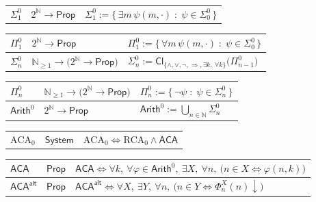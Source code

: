 \documentclass[11pt,reqno]{amsart}
\theoremstyle{blueplain}
\numberwithin{equation}{section}
\begin{document}
{\begin{tabular}{|m{4cm}|m{5cm}|m{9cm}|}
		$\Sigma^0_1$ & $2^{\mathbb{N}}\to\mathsf{Prop}$ & $\Sigma^0_1 := \bigl\{\,\exists m\,\psi(m,\cdot) \;:\; \psi\in\Sigma^0_0\,\bigr\}$ \\
	\end{tabular}%
	\noindent \newline
	\noindent
	\begin{tabular}{|m{4cm}|m{5cm}|m{9cm}|}
		\hline
		$\Pi^0_1$ & $2^{\mathbb{N}}\to\mathsf{Prop}$ & $\Pi^0_1 := \bigl\{\,\forall m\,\psi(m,\cdot) \;:\; \psi\in\Sigma^0_0\,\bigr\}$ \\ \hline
		$\Sigma^0_n$ & $\mathbb{N}_{\geq 1}\to\bigl(2^{\mathbb{N}}\to\mathsf{Prop}\bigr)$ & $\Sigma^0_n := \mathsf{Cl}_{\{\wedge,\vee,\neg,\Rightarrow,\exists k,\ \forall k\}}\bigl(\Pi^0_{n-1}\bigr)$ \\
	\end{tabular}%
	\noindent \newline
	\noindent
	\begin{tabular}{|m{4cm}|m{5cm}|m{9cm}|}
		\hline
		$\Pi^0_n$ & $\mathbb{N}_{\geq 1}\to\bigl(2^{\mathbb{N}}\to\mathsf{Prop}\bigr)$ & $\Pi^0_n := \bigl\{\,\neg\psi \;:\; \psi\in\Sigma^0_n\,\bigr\}$ \\ \hline
		$\mathsf{Arith}^0$ & $2^{\mathbb{N}}\to\mathsf{Prop}$ & $\mathsf{Arith}^0 := \bigcup_{n\in\mathbb{N}}\Sigma^0_n$ \\
	\end{tabular}%
	\noindent \newline
	\noindent
	\begin{tabular}{|m{4cm}|m{5cm}|m{9cm}|}
		\hline
		$\mathrm{ACA}_0$ & $\mathsf{System}$ & $\mathrm{ACA}_0 \iff \mathrm{RCA}_0 \wedge \mathsf{ACA}$ \\
	\end{tabular}%
	\noindent \newline
	\noindent
	\begin{tabular}{|m{4cm}|m{5cm}|m{9cm}|}
		\hline
		$\mathsf{ACA}$ & $\mathsf{Prop}$ & $\mathsf{ACA} \iff \forall k,\ \forall\varphi\in\mathsf{Arith}^0,\ \exists X,\ \forall n,\ \bigl(n\in X\Leftrightarrow\varphi(n,k)\bigr)$ \\ \hline
		$\mathsf{ACA}^{\mathsf{alt}}$ & $\mathsf{Prop}$ & $\mathsf{ACA}^{\mathsf{alt}} \iff \forall X,\ \exists Y,\ \forall n,\ \bigl(n\in Y\Leftrightarrow\Phi_n^X(n)\downarrow\bigr)$ \\
	\end{tabular}%
	\noindent \newline
	\noindent
	\begin{tabular}{|m{4cm}|m{5cm}|m{9cm}|}

\end{tabular}}
\end{document}
